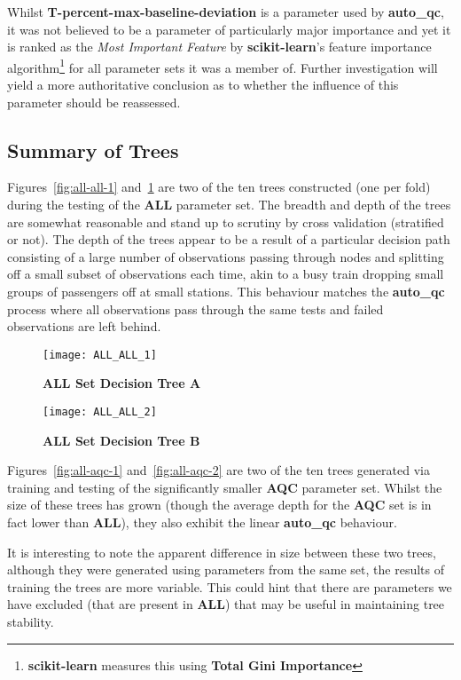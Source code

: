 Whilst \textbf{T-percent-max-baseline-deviation} is a parameter used by
\textbf{auto\_qc}, it was not believed to be a parameter of
particularly major importance and yet it is ranked as the \textit{Most
Important Feature} by \textbf{scikit-learn}'s feature importance
algorithm\footnote{\textbf{scikit-learn} measures this using \textbf{Total Gini
Importance}\citep{gini}}
for all parameter sets it was a member of. Further investigation will yield a
more authoritative conclusion as to whether the influence of this parameter
should be reassessed.


\subsection{Summary of Trees}

Figures~\ref{fig:all-all-1} and~\ref{fig:all-all-2} are two of the ten trees
constructed (one per fold) during the testing of the \textbf{ALL} parameter set.
The breadth and depth of the trees are somewhat reasonable and stand up to
scrutiny by cross validation (stratified or not). The depth of the trees appear
to be a result of a particular decision path consisting of a large number of
observations passing through nodes and splitting off a small subset of
observations each time, akin to a busy train dropping small groups of
passengers off at small stations. This behaviour matches the \textbf{auto\_qc}
process where all observations pass through the same tests and failed
observations are left behind.



\begin{figure}[htbp!]
    \centering
    \texttt{[image: ALL\_ALL\_1]}
    \caption[all-all-1]{\textbf{ALL Set Decision Tree A}}
    \label{fig:all-all-1}

    \vspace{20mm}

    \texttt{[image: ALL\_ALL\_2]}
    \caption[all-all-2]{\textbf{ALL Set Decision Tree B}}
    \label{fig:all-all-2}
\end{figure}

Figures~\ref{fig:all-aqc-1} and~\ref{fig:all-aqc-2} are two of the ten trees
generated via training and testing of the significantly smaller \textbf{AQC}
parameter set. Whilst the size of these trees has grown (though the average
depth for the \textbf{AQC} set is in fact lower than \textbf{ALL}), they also
exhibit the linear \textbf{auto\_qc} behaviour.

It is interesting to note the apparent difference in size between these two
trees, although they were generated using parameters from the same set, the
results of training the trees are more variable. This could hint that there are
parameters we have excluded (that are present in \textbf{ALL}) that may
be useful in maintaining tree stability.

